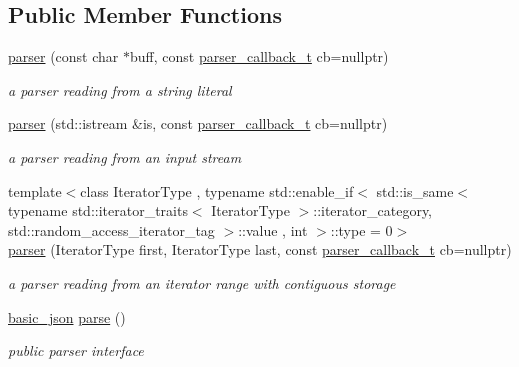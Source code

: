 \subsection*{Public Member Functions}
\begin{DoxyCompactItemize}
\item 
\hyperlink{classnlohmann_1_1basic__json_1_1parser_a12ebdb011909ac2665c07db9c8a337fa}{parser} (const char $\ast$buff, const \hyperlink{classnlohmann_1_1basic__json_a9e35475e2027520a78e09f460dbe048a}{parser\+\_\+callback\+\_\+t} cb=nullptr)
\begin{DoxyCompactList}\small\item\em a parser reading from a string literal \end{DoxyCompactList}\item 
\hyperlink{classnlohmann_1_1basic__json_1_1parser_a6724bcd1644a92ce2d7131ce91bda89a}{parser} (std\+::istream \&is, const \hyperlink{classnlohmann_1_1basic__json_a9e35475e2027520a78e09f460dbe048a}{parser\+\_\+callback\+\_\+t} cb=nullptr)
\begin{DoxyCompactList}\small\item\em a parser reading from an input stream \end{DoxyCompactList}\item 
{\footnotesize template$<$class Iterator\+Type , typename std\+::enable\+\_\+if$<$                                                                              std\+::is\+\_\+same$<$ typename std\+::iterator\+\_\+traits$<$ Iterator\+Type $>$\+::iterator\+\_\+category, std\+::random\+\_\+access\+\_\+iterator\+\_\+tag $>$\+::value                                                                           , int $>$\+::type  = 0$>$ }\\\hyperlink{classnlohmann_1_1basic__json_1_1parser_a8ca2f37f8e97bcf5b851bbb473a8cc29}{parser} (Iterator\+Type first, Iterator\+Type last, const \hyperlink{classnlohmann_1_1basic__json_a9e35475e2027520a78e09f460dbe048a}{parser\+\_\+callback\+\_\+t} cb=nullptr)
\begin{DoxyCompactList}\small\item\em a parser reading from an iterator range with contiguous storage \end{DoxyCompactList}\item 
\hyperlink{classnlohmann_1_1basic__json}{basic\+\_\+json} \hyperlink{classnlohmann_1_1basic__json_1_1parser_a04063124efe4a97b1330525ab653da3c}{parse} ()
\begin{DoxyCompactList}\small\item\em public parser interface \end{DoxyCompactList}\end{DoxyCompactItemize}
